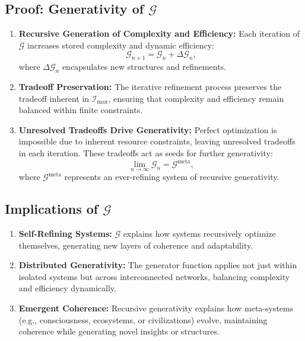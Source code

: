 \documentclass[12pt]{article}
\begin{document}
\subsection{Proof: Generativity of \(\mathcal{G}\)}
\begin{enumerate}
    \item \textbf{Recursive Generation of Complexity and Efficiency:}
    Each iteration of \(\mathcal{G}\) increases stored complexity and dynamic efficiency:
    \[
    \mathcal{G}_{n+1} = \mathcal{G}_n + \Delta \mathcal{G}_n,
    \]
    where \(\Delta \mathcal{G}_n\) encapsulates new structures and refinements.

    \item \textbf{Tradeoff Preservation:}
    The iterative refinement process preserves the tradeoff inherent in \(\mathcal{I}_{\text{max}}\), ensuring that complexity and efficiency remain balanced within finite constraints.

    \item \textbf{Unresolved Tradeoffs Drive Generativity:}
    Perfect optimization is impossible due to inherent resource constraints, leaving unresolved tradeoffs in each iteration. These tradeoffs act as seeds for further generativity:
    \[
    \lim_{n \to \infty} \mathcal{G}_n = \mathcal{G}^{\text{meta}},
    \]
    where \(\mathcal{G}^{\text{meta}}\) represents an ever-refining system of recursive generativity.
\end{enumerate}

\subsection{Implications of \(\mathcal{G}\)}
\begin{enumerate}
    \item \textbf{Self-Refining Systems:}
    \(\mathcal{G}\) explains how systems recursively optimize themselves, generating new layers of coherence and adaptability.
    \item \textbf{Distributed Generativity:}
    The generator function applies not just within isolated systems but across interconnected networks, balancing complexity and efficiency dynamically.
    \item \textbf{Emergent Coherence:}
    Recursive generativity explains how meta-systems (e.g., consciousness, ecosystems, or civilizations) evolve, maintaining coherence while generating novel insights or structures.
\end{enumerate}
\end{document}
